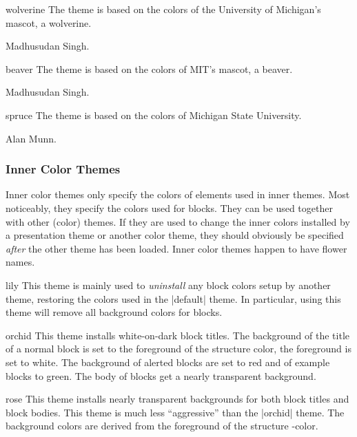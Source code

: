 \begin{colorthemeexample}{wolverine}
  The theme is based on the colors of the University of Michigan's mascot, a wolverine.

  \themeauthor Madhusudan Singh.
\end{colorthemeexample}

\begin{colorthemeexample}{beaver}
  The theme is based on the colors of MIT's mascot, a beaver.

  \themeauthor Madhusudan Singh.
\end{colorthemeexample}

\begin{colorthemeexample}{spruce}
  The theme is based on the colors of Michigan State University.
  
  \themeauthor Alan Munn.
\end{colorthemeexample}

\subsubsection{Inner Color Themes}

Inner color themes only specify the colors of elements used in inner themes. Most noticeably, they specify the colors used for blocks. They can be used together with other (color) themes. If they are used to change the inner colors installed by a presentation theme or another color theme, they should obviously be specified \emph{after} the other theme has been loaded. Inner color themes happen to have flower names.

\begin{colorthemeexample}{lily}
  This theme is mainly used to \emph{uninstall} any block colors setup by another theme, restoring the colors used in the |default| theme. In particular, using this theme will remove all background colors for blocks.
\end{colorthemeexample}

\begin{colorthemeexample}{orchid}
  This theme installs white-on-dark block titles. The background of the title of a normal block is set to the foreground of the structure color, the foreground is set to white. The background of alerted blocks are set to red and of example blocks to green. The body of blocks get a nearly transparent background.
\end{colorthemeexample}

\begin{colorthemeexample}{rose}
  This theme installs nearly transparent backgrounds for both block titles and block bodies. This theme is much less ``aggressive'' than the |orchid| theme. The background colors are derived from the foreground of the structure \beamer-color.
\end{colorthemeexample}

